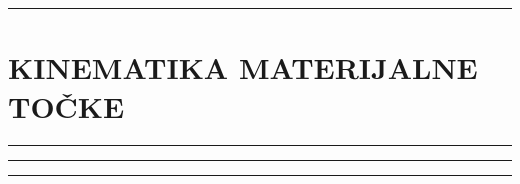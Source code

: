 \documentclass[10pt]{book}
\newcounter{zadatak} %
\newcounter{cjelina}
\begin{document}
{\color{boja} \rule{\linewidth}{0.3mm} }


\setcounter{zadatak}{0}

\section{KINEMATIKA MATERIJALNE TOČKE}

{\color{boja} \rule{\linewidth}{0.3mm} }


{\color{boja} \rule{\linewidth}{0.3mm} }


{\color{boja} \rule{\linewidth}{0.3mm} }



\setcounter{zadatak}{0}






%

%

\end{document}
